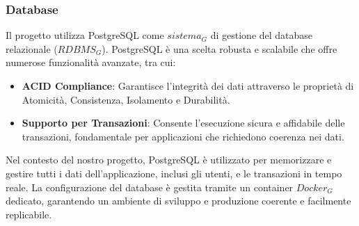 \newpage
\subsubsection{Database}
Il progetto utilizza PostgreSQL come $\textit{sistema}_G$ di gestione del database relazionale ($\textit{RDBMS}_G$). PostgreSQL è una scelta robusta e scalabile che offre numerose funzionalità avanzate, tra cui:

\begin{itemize}
\item \textbf{ACID Compliance}: Garantisce l'integrità dei dati attraverso le proprietà di Atomicità, Consistenza, Isolamento e Durabilità.
\item \textbf{Supporto per Transazioni}: Consente l'esecuzione sicura e affidabile delle transazioni, fondamentale per applicazioni che richiedono coerenza nei dati.
\end{itemize}
Nel contesto del nostro progetto, PostgreSQL è utilizzato per memorizzare e gestire tutti i dati dell'applicazione, inclusi gli utenti, e le transazioni in tempo reale. La configurazione del database è gestita tramite un container $\textit{Docker}_G$ dedicato, garantendo un ambiente di sviluppo e produzione coerente e facilmente replicabile.
